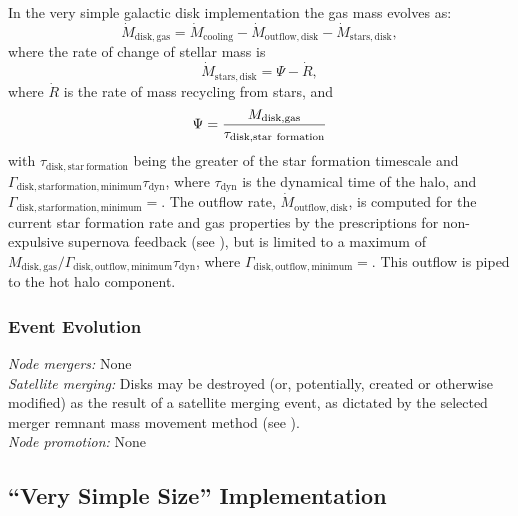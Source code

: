 In the very simple galactic disk implementation the gas mass evolves as:
\begin{equation}
 \dot{M}_\mathrm{disk, gas} = \dot{M}_\mathrm{cooling} - \dot{M}_\mathrm{outflow, disk} - \dot{M}_\mathrm{stars, disk},
\end{equation}
where the rate of change of stellar mass is
\begin{equation}
 \dot{M}_\mathrm{stars, disk} = \Psi - \dot{R},
\end{equation}
where $\dot{R}$ is the rate of mass recycling from stars, and
\begin{equation}
 \Psi = {M_\mathrm{disk, gas} \over \tau_\mathrm{disk, star~formation}}
\end{equation}
with $\tau_\mathrm{disk, star~formation}$ being the greater of the star formation timescale and $\Gamma_\mathrm{disk, star formation, minimum} \tau_\mathrm{dyn}$, where $\tau_\mathrm{dyn}$ is the dynamical time of the halo, and $\Gamma_\mathrm{disk, star formation, minimum}=${\normalfont \ttfamily [diskStarFormationTimescaleMinimum]}. The outflow rate, $\dot{M}_\mathrm{outflow, disk}$, is computed for the current star formation rate and gas properties by the prescriptions for non-expulsive supernova feedback (see ), but is limited to a maximum of $M_\mathrm{disk, gas}/ \Gamma_\mathrm{disk, outflow, minimum} \tau_\mathrm{dyn}$, where $\Gamma_\mathrm{disk, outflow, minimum}=${\normalfont \ttfamily [diskOutflowTimescaleMinimum]}. This outflow is piped to the hot halo component.

\subsubsection{Event Evolution}

\noindent\emph{Node mergers:} None\\

\noindent\emph{Satellite merging:} Disks may be destroyed (or, potentially, created or otherwise modified) as the result of a satellite merging event, as dictated by the selected merger remnant mass movement method (see ).\\

\noindent\emph{Node promotion:} None\\

\subsection{``Very Simple Size'' Implementation}

